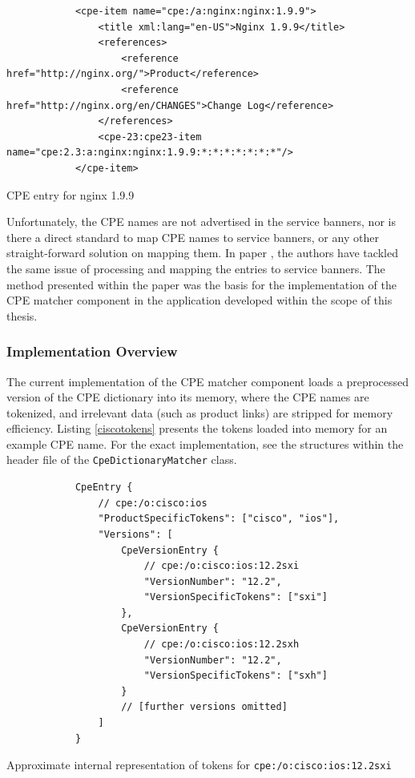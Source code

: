 \documentclass[a4paper,12pt]{article}
\begin{document}
	\begin{listing}[H]
		\begin{verbatim}
			<cpe-item name="cpe:/a:nginx:nginx:1.9.9">
				<title xml:lang="en-US">Nginx 1.9.9</title>
				<references>
					<reference href="http://nginx.org/">Product</reference>
					<reference href="http://nginx.org/en/CHANGES">Change Log</reference>
				</references>
				<cpe-23:cpe23-item name="cpe:2.3:a:nginx:nginx:1.9.9:*:*:*:*:*:*:*"/>
			</cpe-item>
		\end{verbatim}
		\caption{CPE entry for nginx 1.9.9}
		\label{nginxcpe}
	\end{listing}
	
	Unfortunately, the CPE names are not advertised in the service banners, nor is there a direct standard to map CPE names to service banners, or any other straight-forward solution on mapping them. In paper \cite{shovat15}, the authors have tackled the same issue of processing and mapping the entries to service banners. The method presented within the paper was the basis for the implementation of the CPE matcher component in the application developed within the scope of this thesis.
	
\subsubsection{Implementation Overview}
 
	
	The current implementation of the CPE matcher component loads a preprocessed version of the CPE dictionary into its memory, where the CPE names are tokenized, and irrelevant data (such as product links) are stripped for memory efficiency. Listing \ref{ciscotokens} presents the tokens loaded into memory for an example CPE name. For the exact implementation, see the structures within the header file of the \texttt{CpeDictionaryMatcher} class.
	
	\begin{listing}[H]
		\begin{verbatim}
			CpeEntry {
				// cpe:/o:cisco:ios
				"ProductSpecificTokens": ["cisco", "ios"],
				"Versions": [
					CpeVersionEntry {
						// cpe:/o:cisco:ios:12.2sxi
						"VersionNumber": "12.2",
						"VersionSpecificTokens": ["sxi"]
					},
					CpeVersionEntry {
						// cpe:/o:cisco:ios:12.2sxh
						"VersionNumber": "12.2",
						"VersionSpecificTokens": ["sxh"]
					}
					// [further versions omitted]
				]
			}
		\end{verbatim}
		\caption{Approximate internal representation of tokens for \texttt{cpe:/o:cisco:ios:12.2sxi}}
		\label{ciscotokens}
	\end{listing}
	
\end{document}

